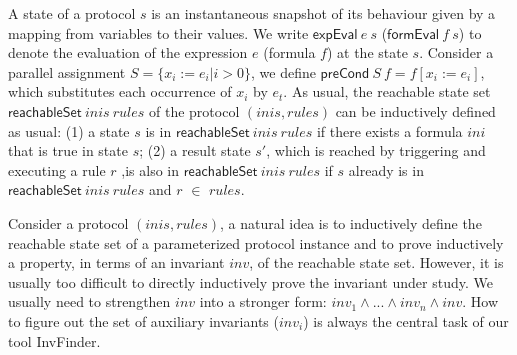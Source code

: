 \documentclass{llncs}
\newcommand\lyj[1]{\textcolor{green}{lyj: #1}}
\begin{document}
A  state of a protocol $s$ is an instantaneous snapshot of its
behaviour given by a mapping from variables to their values. We
write $\mathsf{expEval}~e~s$ ($\mathsf{formEval}~f~s$) to denote the
evaluation of the expression $e$ (formula $f$) at the state $s$. %
 Consider a parallel assignment
$S=\{x_i:=e_i | i>0\}$, we define
$\mathsf{preCond}~S~f=f[x_i:=e_i]$, which substitutes each occurrence
of $x_i$ by $e_t$. As usual, the reachable state set
$\mathsf{reachableSet}~ inis ~rules$ of the protocol $(inis,rules)$
can be inductively defined as usual: (1) a state $s$ is in
$\mathsf{reachableSet}~inis~ rules$ if
 there exists a formula $ini$ that is true in state $s$; (2) a result state $s'$, which is reached by triggering and
 executing a rule $r$ ,is also in
 $\mathsf{reachableSet}~inis~ rules$ if $s$ already is in
 $\mathsf{reachableSet}~inis~ rules$ and $r $ $\in$  $rules$.

Consider a protocol $(inis,rules)$, a natural
idea is to inductively define the reachable state set of a
parameterized protocol instance and to prove inductively a
property, in terms of an invariant $inv$, of the reachable state set.
However, it is usually too difficult to directly inductively prove the invariant under study.
We usually need to strengthen $inv$ into a stronger form:
$inv_1\wedge ...\wedge inv_n \wedge inv$.
How to figure out the set of auxiliary invariants ($inv_i$)
is always the central task of our tool {\sf InvFinder}.
\end{document}
